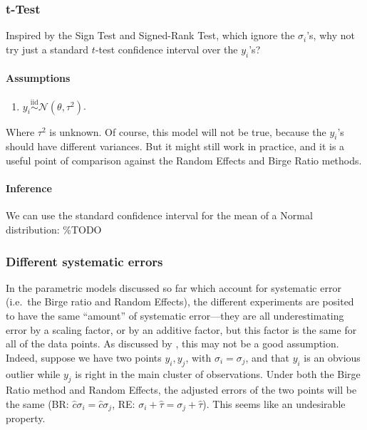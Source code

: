 \documentclass[letterpaper,12pt]{article}
\begin{document}
\subsubsection{t-Test}\label{t-test}

Inspired by the Sign Test and Signed-Rank Test, which ignore the $\sigma_i$'s, why not try just a standard $t$-test confidence interval over the $y_i$'s?

\paragraph{Assumptions}\label{assumptions-5}

\begin{enumerate}
\item
  $y_i\overset{\mathrm{iid}}{\sim}\mathcal{N}(\theta,\tau^2)$.
\end{enumerate}

Where $\tau^2$ is unknown. Of course, this model will not be true, because the $y_i$'s should have different variances. But it might still work in practice, and it is a useful point of comparison against the Random Effects and Birge Ratio methods.

\paragraph{Inference}\label{inference-5}

We can use the standard confidence interval for the mean of a Normal distribution:
\%TODO

\subsubsection{Different systematic errors}

In the parametric models discussed so far which account for systematic error (i.e.~the Birge ratio and Random Effects), the different experiments are posited to have the same ``amount'' of systematic error---they are all underestimating error by a scaling factor, or by an additive factor, but this factor is the same for all of the data points. As discussed by \citet{taylor1982numerical}, this may not be a good assumption. Indeed, suppose we have two points $y_i,y_j$, with $\sigma_i=\sigma_j$, and that $y_i$ is an obvious outlier while $y_j$ is right in the main cluster of observations. Under both the Birge Ratio method and Random Effects, the adjusted errors of the two points will be the same (BR: $\hat c\sigma_i=\hat c\sigma_j$, RE: $\sigma_i+\hat \tau=\sigma_j+\hat \tau$). This seems like an undesirable property.
\end{document}
